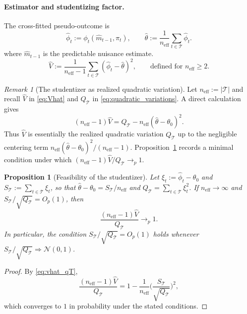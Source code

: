 \documentclass[11pt]{article}
\numberwithin{equation}{section}
\theoremstyle{plain}
\newtheorem{proposition}[theorem]{Proposition}
\theoremstyle{definition}
\theoremstyle{remark}
\newtheorem{remark}[theorem]{Remark}
\begin{document}
\paragraph{Estimator and studentizing factor.}
The cross-fitted pseudo-outcome is
\begin{equation}\label{eq:phi_hat}
\widehat{\phi}_t := \phi_t(\widehat m_{t-1},\pi_t),
\qquad
\widehat{\theta} := \frac{1}{n_{\mathrm{eff}}}\sum_{t\in \mathcal{T}} \widehat{\phi}_t.
\end{equation}
where $\widehat m_{t-1}$ is the predictable nuisance estimate.
\begin{equation}\label{eq:Vhat}
\widehat V := \frac{1}{n_{\mathrm{eff}}-1}\sum_{t\in\mathcal{T}}(\widehat{\phi}_t-\widehat{\theta})^2,
\qquad\text{defined for } n_{\mathrm{eff}}\ge 2.
\end{equation}
\begin{remark}[The studentizer as realized quadratic variation]\label{rem:studentizer_qv}
Let $n_{\mathrm{eff}}:=|\mathcal{T}|$ and recall $\widehat V$ in \eqref{eq:Vhat} and $Q_{\mathcal{T}}$ in \eqref{eq:quadratic_variations}. A direct calculation gives
\begin{equation}\label{eq:vhat_qT}
(n_{\mathrm{eff}}-1)\widehat V
=
Q_{\mathcal{T}} - n_{\mathrm{eff}}(\widehat\theta-\theta_0)^2.
\end{equation}
Thus $\widehat V$ is essentially the realized quadratic variation $Q_{\mathcal{T}}$ up to the negligible centering term $n_{\mathrm{eff}}(\widehat\theta-\theta_0)^2/(n_{\mathrm{eff}}-1)$. Proposition~\ref{prop:feasibility} records a minimal condition under which $(n_{\mathrm{eff}}-1)\widehat V/Q_{\mathcal{T}}\to_p 1$.
\end{remark}

\begin{proposition}[Feasibility of the studentizer]\label{prop:feasibility}
Let $\xi_t:=\widehat\phi_t-\theta_0$ and $S_{\mathcal{T}}:=\sum_{t\in\mathcal{T}}\xi_t$, so that $\widehat\theta-\theta_0=S_{\mathcal{T}}/n_{\mathrm{eff}}$ and $Q_{\mathcal{T}}=\sum_{t\in\mathcal{T}}\xi_t^2$. If $n_{\mathrm{eff}}\to\infty$ and $S_{\mathcal{T}}/\sqrt{Q_{\mathcal{T}}}=O_p(1)$, then
\[
\frac{(n_{\mathrm{eff}}-1)\widehat V}{Q_{\mathcal{T}}}\to_p 1.
\]
In particular, the condition $S_{\mathcal{T}}/\sqrt{Q_{\mathcal{T}}}=O_p(1)$ holds whenever $S_{\mathcal{T}}/\sqrt{Q_{\mathcal{T}}}\Rightarrow \mathcal{N}(0,1)$.
\end{proposition}
\begin{proof}
By \eqref{eq:vhat_qT},
\[
\frac{(n_{\mathrm{eff}}-1)\widehat V}{Q_{\mathcal{T}}}
=
1-\frac{1}{n_{\mathrm{eff}}}\Big(\frac{S_{\mathcal{T}}}{\sqrt{Q_{\mathcal{T}}}}\Big)^2,
\]
which converges to $1$ in probability under the stated conditions.
\end{proof}
\end{document}
